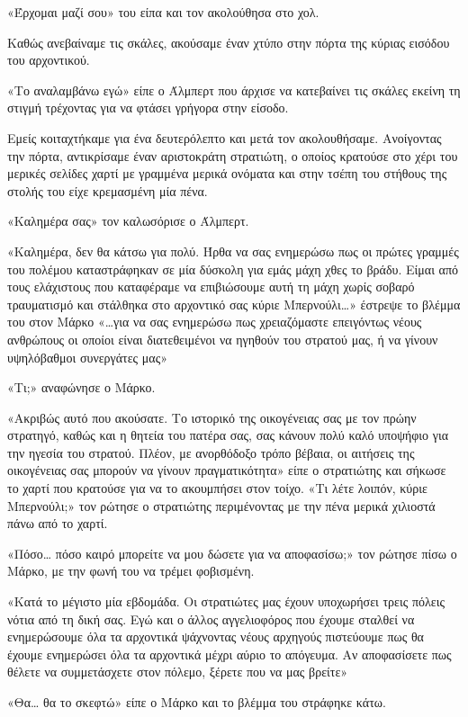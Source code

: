 \documentclass[12pt,twoside, openany]{book}
\begin{document}
«Έρχομαι μαζί σου» του είπα και τον ακολούθησα στο χολ.

Καθώς ανεβαίναμε τις σκάλες, ακούσαμε έναν χτύπο στην πόρτα της κύριας εισόδου του αρχοντικού.

«Το αναλαμβάνω εγώ» είπε ο Άλμπερτ που άρχισε να κατεβαίνει τις σκάλες εκείνη τη στιγμή τρέχοντας για να φτάσει γρήγορα στην είσοδο. 

Εμείς κοιταχτήκαμε για ένα δευτερόλεπτο και μετά τον ακολουθήσαμε. Ανοίγοντας την πόρτα, αντικρίσαμε έναν αριστοκράτη στρατιώτη, ο οποίος κρατούσε στο χέρι του μερικές σελίδες χαρτί με γραμμένα μερικά ονόματα και στην τσέπη του στήθους της στολής του είχε κρεμασμένη μία πένα. 

«Καλημέρα σας» τον καλωσόρισε ο Άλμπερτ.

«Καλημέρα, δεν θα κάτσω για πολύ. Ήρθα να σας ενημερώσω πως οι πρώτες γραμμές του πολέμου καταστράφηκαν σε μία δύσκολη για εμάς μάχη χθες το βράδυ. Είμαι από τους ελάχιστους που καταφέραμε να επιβιώσουμε  αυτή τη μάχη χωρίς σοβαρό τραυματισμό και στάλθηκα στο αρχοντικό σας κύριε Μπερνούλι…» έστρεψε το βλέμμα του στον Μάρκο «…για να σας ενημερώσω πως χρειαζόμαστε επειγόντως νέους ανθρώπους οι οποίοι είναι διατεθειμένοι να ηγηθούν του στρατού μας, ή να γίνουν υψηλόβαθμοι συνεργάτες μας»

«Τι;» αναφώνησε ο Μάρκο.

«Ακριβώς αυτό που ακούσατε. Το ιστορικό της οικογένειας σας με τον πρώην στρατηγό, καθώς και η θητεία του πατέρα σας, σας κάνουν πολύ καλό υποψήφιο για την ηγεσία του στρατού. Πλέον, με ανορθόδοξο τρόπο βέβαια, οι αιτήσεις της οικογένειας σας μπορούν να γίνουν πραγματικότητα» είπε ο στρατιώτης και σήκωσε το χαρτί που κρατούσε για να το ακουμπήσει στον τοίχο. «Τι λέτε λοιπόν, κύριε Μπερνούλι;» τον ρώτησε ο στρατιώτης περιμένοντας με την πένα μερικά χιλιοστά πάνω από το χαρτί.

«Πόσο… πόσο καιρό μπορείτε να μου δώσετε για να αποφασίσω;» τον ρώτησε πίσω ο Μάρκο, με την φωνή του να τρέμει φοβισμένη.

«Κατά το μέγιστο μία εβδομάδα. Οι στρατιώτες μας έχουν υποχωρήσει τρεις πόλεις νότια από τη δική σας. Εγώ και ο άλλος αγγελιοφόρος που έχουμε σταλθεί να ενημερώσουμε όλα τα αρχοντικά ψάχνοντας νέους αρχηγούς πιστεύουμε πως θα έχουμε ενημερώσει όλα τα αρχοντικά μέχρι αύριο το απόγευμα. Αν αποφασίσετε πως θέλετε να συμμετάσχετε στον πόλεμο, ξέρετε που να μας βρείτε»

«Θα… θα το σκεφτώ» είπε ο Μάρκο και το βλέμμα του στράφηκε κάτω.
\end{document}

